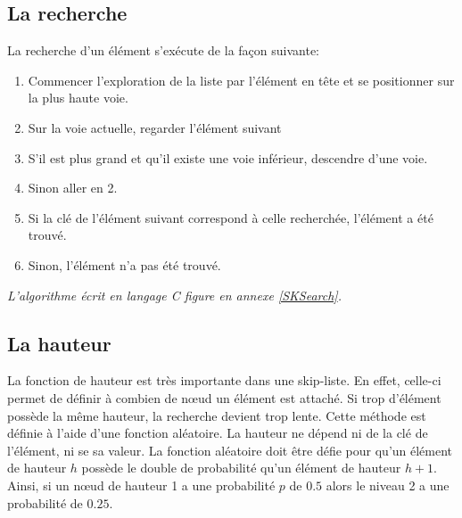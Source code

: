 \documentclass[hidelinks,a4paper, 12pt]{article}
\begin{document}
	\subsection{La recherche}
	La recherche d'un élément s'exécute de la façon suivante:
	\begin{enumerate}
		\item Commencer l'exploration de la liste par l'élément en tête et se positionner sur la plus haute voie.
		\item Sur la voie actuelle, regarder l'élément suivant
		\item S'il est plus grand et qu'il existe une voie inférieur, descendre d'une voie.
		\item Sinon aller en 2.
		\item Si la clé de l'élément suivant correspond à celle recherchée, l'élément a été trouvé.
		\item Sinon, l'élément n'a pas été trouvé.
	\end{enumerate}
	\emph{L'algorithme écrit en langage C figure en annexe \ref{SKSearch}.}
	
	\subsection{La hauteur}
	La fonction de hauteur est très importante dans une skip-liste. En effet, celle-ci permet de définir à combien de nœud un élément est attaché. Si trop d'élément possède la même hauteur, la recherche devient trop lente.	Cette méthode est définie à l'aide d'une fonction aléatoire. La hauteur ne dépend ni de la clé de l'élément, ni se sa valeur. La fonction aléatoire doit être défie pour qu'un élément de hauteur $h$ possède le double de probabilité qu'un élément de hauteur $h+1$. Ainsi, si un nœud de hauteur 1 a une probabilité $p$ de $0.5$ alors le niveau 2 a une probabilité de $0.25$.
	
\end{document}
